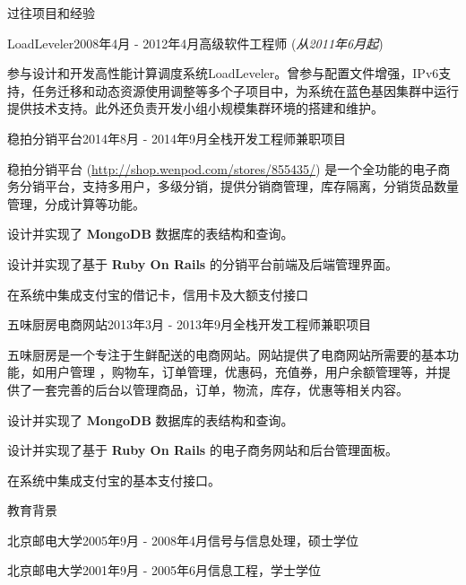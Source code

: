 \documentclass{resume} %
\newcommand{\http}{http:/\hspace{-0.3ex}/}
\newcommand{\kaiti}{\CJKfamily{kaiti}}
\begin{document}
\begin{rSection}{\kaiti 过往项目和经验}
\begin{rSubsection}{LoadLeveler}{2008年4月 - 2012年4月}{高级软件工程师 (\textit{从2011年6月起})}{}

参与设计和开发高性能计算调度系统LoadLeveler。曾参与配置文件增强，IPv6支持，任务迁移和动态资源使用调整等多个子项目中，为系统在蓝色基因集群中运行提供技术支持。此外还负责开发小组小规模集群环境的搭建和维护。

\end{rSubsection}



\begin{rSubsection}{稳拍分销平台}{2014年8月 - 2014年9月}{全栈开发工程师}{兼职项目}

稳拍分销平台 (\href{http://shop.wenpod.com/stores/855435/}{\http{}shop.wenpod.com/stores/855435/}) 是一个全功能的电子商务分销平台，支持多用户，多级分销，提供分销商管理，库存隔离，分销货品数量管理，分成计算等功能。

\begin{rSubsectionList}
\item 设计并实现了 \textbf{MongoDB} 数据库的表结构和查询。
\item 设计并实现了基于 \textbf{Ruby On Rails} 的分销平台前端及后端管理界面。
\item 在系统中集成支付宝的借记卡，信用卡及大额支付接口
\end{rSubsectionList}
\end{rSubsection}



\begin{rSubsection}{五味厨房电商网站}{2013年3月 - 2013年9月}{全栈开发工程师}{兼职项目}

五味厨房是一个专注于生鲜配送的电商网站。网站提供了电商网站所需要的基本功能，如用户管理 ，购物车，订单管理，优惠码，充值券，用户余额管理等，并提供了一套完善的后台以管理商品，订单，物流，库存，优惠等相关内容。

\begin{rSubsectionList}
\item 设计并实现了 \textbf{MongoDB} 数据库的表结构和查询。
\item 设计并实现了基于 \textbf{Ruby On Rails} 的电子商务网站和后台管理面板。
\item 在系统中集成支付宝的基本支付接口。
\end{rSubsectionList}
\end{rSubsection}

\end{rSection}

\begin{rSection}{\kaiti 教育背景}
\begin{rSubsection}{北京邮电大学}{2005年9月 - 2008年4月}{信号与信息处理，硕士学位}{}
\end{rSubsection}

\begin{rSubsection}{北京邮电大学}{2001年9月 - 2005年6月}{信息工程，学士学位}{}
\end{rSubsection}

\end{rSection}
\end{document}
